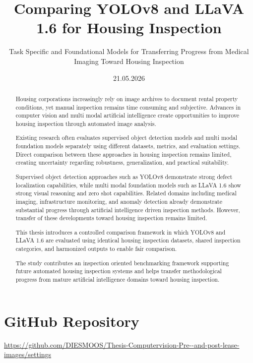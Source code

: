 \documentclass[ds]{mscthesis}
\title{Comparing YOLOv8 and LLaVA 1.6 for Housing Inspection}
\subtitle{Task Specific and Foundational Models for Transferring Progress from Medical Imaging Toward Housing Inspection}
\date{21.05.2026}
\begin{document}
\pagestyle{plain}

\maketitlepage
\fixemptypage
\setcounter{page}{0}
\begin{abstract}
Housing corporations increasingly rely on image archives to document rental property conditions, yet manual inspection remains time consuming and subjective. Advances in computer vision and multi modal artificial intelligence create opportunities to improve housing inspection through automated image analysis.

Existing research often evaluates supervised object detection models and multi modal foundation models separately using different datasets, metrics, and evaluation settings. Direct comparison between these approaches in housing inspection remains limited, creating uncertainty regarding robustness, generalization, and practical suitability.

Supervised object detection approaches such as YOLOv8 demonstrate strong defect localization capabilities, while multi modal foundation models such as LLaVA 1.6 show strong visual reasoning and zero shot capabilities. Related domains including medical imaging, infrastructure monitoring, and anomaly detection already demonstrate substantial progress through artificial intelligence driven inspection methods. However, transfer of these developments toward housing inspection remains limited.

This thesis introduces a controlled comparison framework in which YOLOv8 and LLaVA 1.6 are evaluated using identical housing inspection datasets, shared inspection categories, and harmonized outputs to enable fair comparison.

The study contributes an inspection oriented benchmarking framework supporting future automated housing inspection systems and helps transfer methodological progress from mature artificial intelligence domains toward housing inspection.
\end{abstract}
\maketitle

\section*{GitHub Repository}
\url{https://github.com/DIESMOOS/Thesis-Computervision-Pre--and-post-lease-images/settings}












\onecolumn
\appendix
\clearpage

\end{document}
